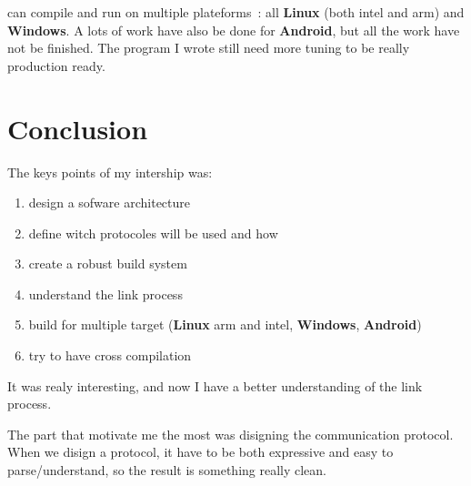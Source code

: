 \documentclass[a4paper,11pt]{custom}
\newcommand{\linux}{\textbf{Linux}}
\newcommand{\win}{\textbf{Windows}}
\newcommand{\android}{\textbf{Android}}
\begin{document}
can compile and run on multiple plateforms~: all \linux{} (both intel and arm) and
\win. A lots of work have also be done for \android, but all the work have
not be finished.
The program I wrote still need more tuning to be really production ready.



\chapter{Conclusion}

The keys points of my intership was:
\begin{enumerate}
\item design a sofware architecture
\item define witch protocoles will be used and how
\item create a robust build system
\item understand the link process
\item build for multiple target (\linux{} arm and intel, \win, \android)
\item try to have cross compilation
\end{enumerate}

It was realy interesting, and now I have a better understanding of the link
process.

The part that motivate me the most was disigning the communication protocol.
When we disign a protocol, it have to be both expressive and easy to
parse/understand, so the result is something really clean.
\end{document}
